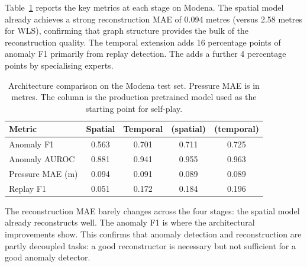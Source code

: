 Table~\ref{tab:arch_comparison} reports the key metrics at each
stage on Modena. The spatial model already achieves a strong
reconstruction MAE of 0.094 metres (versus 2.58 metres
for WLS), confirming that graph structure provides the
bulk of the reconstruction quality. The temporal extension adds
16 percentage points of anomaly F1 primarily from replay detection.
The \moe{} adds a further 4 percentage points by specialising experts.

\begin{table}[htbp]
  \centering
  \caption{Architecture comparison on the Modena test set. Pressure
  MAE is in metres. The \moe{} column is the production
  pretrained model used as the starting point for self-play.}
  \label{tab:arch_comparison}
  \begin{tabular}{lcccc}
    \toprule
    Metric & Spatial & Temporal & \moe{} (spatial) & \moe{} (temporal) \\
    \midrule
    Anomaly F1         & 0.563 & 0.701 & 0.711 & 0.725 \\
    Anomaly AUROC      & 0.881 & 0.941 & 0.955 & 0.963 \\
    Pressure MAE (m)   & 0.094 & 0.091 & 0.089 & 0.089 \\
    Replay F1          & 0.051 & 0.172 & 0.184 & 0.196 \\
    \bottomrule
  \end{tabular}
\end{table}

The reconstruction MAE barely changes across the four
stages: the spatial model already reconstructs well. The anomaly F1
is where the architectural improvements show. This confirms that
anomaly detection and reconstruction are partly decoupled tasks:
a good reconstructor is necessary but not sufficient for a good
anomaly detector.
